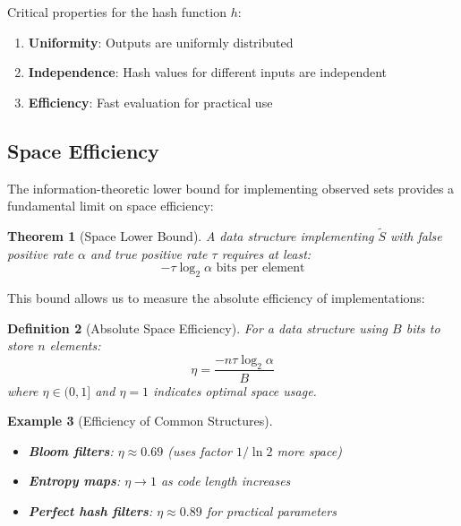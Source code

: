 \documentclass[11pt,final,hidelinks]{article}
\newtheorem{theorem}{Theorem}[section]
\newtheorem{definition}[theorem]{Definition}
\newtheorem{example}[theorem]{Example}
\newcommand{\obs}[1]{\widetilde{#1}}  %
\begin{document}
Critical properties for the hash function $h$:
\begin{enumerate}
    \item \textbf{Uniformity}: Outputs are uniformly distributed
    \item \textbf{Independence}: Hash values for different inputs are independent
    \item \textbf{Efficiency}: Fast evaluation for practical use
\end{enumerate}

\subsection{Space Efficiency}

The information-theoretic lower bound for implementing observed sets provides a fundamental limit on space efficiency:

\begin{theorem}[Space Lower Bound]
A data structure implementing $\obs{S}$ with false positive rate $\alpha$ and true positive rate $\tau$ requires at least:
\begin{equation}
-\tau \log_2 \alpha \text{ bits per element}
\end{equation}
\end{theorem}

This bound allows us to measure the absolute efficiency of implementations:

\begin{definition}[Absolute Space Efficiency]
For a data structure using $B$ bits to store $n$ elements:
\begin{equation}
\eta = \frac{-n\tau \log_2 \alpha}{B}
\end{equation}
where $\eta \in (0, 1]$ and $\eta = 1$ indicates optimal space usage.
\end{definition}

\begin{example}[Efficiency of Common Structures]
\begin{itemize}
    \item \textbf{Bloom filters}: $\eta \approx 0.69$ (uses factor $1/\ln 2$ more space)
    \item \textbf{Entropy maps}: $\eta \to 1$ as code length increases
    \item \textbf{Perfect hash filters}: $\eta \approx 0.89$ for practical parameters
\end{itemize}
\end{example}
\end{document}
